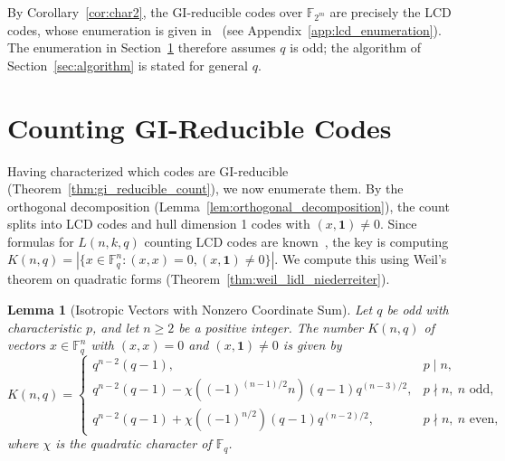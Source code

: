 \documentclass[11pt]{article}
\newcommand{\FF}{\mathbb{F}}
\newcommand{\0}{\mathbf{0}}
\newcommand{\1}{\mathbf{1}}
\theoremstyle{plain}
\newtheorem{lemma}[theorem]{Lemma}
\theoremstyle{definition}
\theoremstyle{remark}
\begin{document}
By Corollary~\ref{cor:char2}, the GI-reducible codes over $\FF_{2^m}$ are precisely the LCD codes, whose enumeration is given in~\cite{carlet2019new,lishiling2025} (see Appendix~\ref{app:lcd_enumeration}). The enumeration in Section~\ref{sec:enumeration} therefore assumes $q$ is odd; the algorithm of Section~\ref{sec:algorithm} is stated for general $q$.

\section{Counting GI-Reducible Codes}
\label{sec:enumeration}

Having characterized which codes are GI-reducible (Theorem~\ref{thm:gi_reducible_count}), we now enumerate them. By the orthogonal decomposition (Lemma~\ref{lem:orthogonal_decomposition}), the count splits into LCD codes and hull dimension 1 codes with $(x,\1) \neq 0$. Since formulas for $L(n,k,q)$ counting LCD codes are known~\cite{carlet2019new,lishiling2025}, the key is computing $K(n,q) = |\{x \in \FF_q^n : (x,x) = 0, (x,\1) \neq 0\}|$. We compute this using Weil's theorem on quadratic forms (Theorem~\ref{thm:weil_lidl_niederreiter}).

\begin{lemma}[Isotropic Vectors with Nonzero Coordinate Sum]
\label{lem:quadratic_count}
Let $q$ be odd with characteristic $p$, and let $n \geq 2$ be a positive integer.
The number $K(n,q)$ of vectors $x \in \mathbb{F}_q^n$ with $(x,x) = 0$ and $(x, \1) \neq 0$ is given by
$$
K(n,q) = \begin{cases}
q^{n-2}(q-1), & p \mid n, \\
q^{n-2}(q-1) - \chi((-1)^{(n-1)/2} n)(q-1)q^{(n-3)/2}, & p \nmid n,\ n \text{ odd,} \\
q^{n-2}(q-1) + \chi((-1)^{n/2})(q-1)q^{(n-2)/2}, & p \nmid n,\ n \text{ even,}
\end{cases}
$$
where $\chi$ is the quadratic character of $\mathbb{F}_q$.
\end{lemma}
\end{document}

